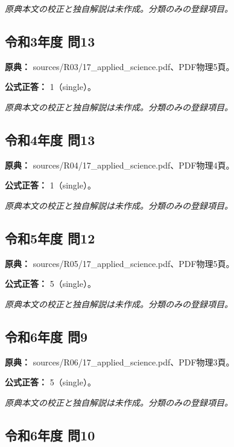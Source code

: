 \par\textit{原典本文の校正と独自解説は未作成。分類のみの登録項目。}

\subsection{令和3年度 問13}
\label{q:r03-reg-applied-13}

\noindent\textbf{原典：} sources/R03/17\_applied\_science.pdf、PDF物理5頁。

\textbf{公式正答：} 1（single）。

\par\textit{原典本文の校正と独自解説は未作成。分類のみの登録項目。}

\subsection{令和4年度 問13}
\label{q:r04-reg-applied-13}

\noindent\textbf{原典：} sources/R04/17\_applied\_science.pdf、PDF物理4頁。

\textbf{公式正答：} 1（single）。

\par\textit{原典本文の校正と独自解説は未作成。分類のみの登録項目。}

\subsection{令和5年度 問12}
\label{q:r05-reg-applied-12}

\noindent\textbf{原典：} sources/R05/17\_applied\_science.pdf、PDF物理5頁。

\textbf{公式正答：} 5（single）。

\par\textit{原典本文の校正と独自解説は未作成。分類のみの登録項目。}

\subsection{令和6年度 問9}
\label{q:r06-reg-applied-09}

\noindent\textbf{原典：} sources/R06/17\_applied\_science.pdf、PDF物理3頁。

\textbf{公式正答：} 5（single）。

\par\textit{原典本文の校正と独自解説は未作成。分類のみの登録項目。}

\subsection{令和6年度 問10}
\label{q:r06-reg-applied-10}

